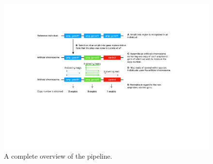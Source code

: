\documentclass[
journal=jacsat, %
manuscript=article]{achemso}
\begin{document}
\begin{figure}
  \includegraphics[width=\linewidth]{illustrations/figure_pipeline.pdf}
  \caption{A complete overview of the pipeline.}
  \label{fig:pipeline}
\end{figure}
\end{document}
